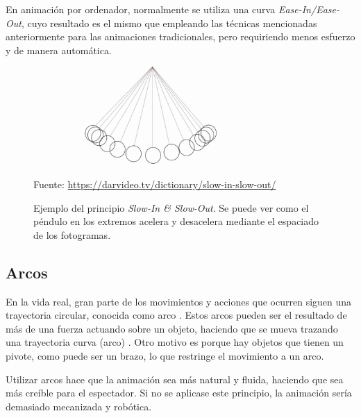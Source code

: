 \documentclass{article}
\begin{document}
\bigskip

En animación por ordenador, normalmente se utiliza una curva \textit{Ease-In/Ease-Out}, cuyo resultado es el mismo que empleando las técnicas mencionadas anteriormente para las animaciones tradicionales, pero requiriendo menos esfuerzo y de manera automática.

\begin{figure}[H]
    \centering
    \includegraphics[width=0.8\textwidth]{imagenes/Slow-In-and-Slow-Out.jpg}
    \caption{Ejemplo del principio \textit{Slow-In \& Slow-Out}. Se puede ver como el péndulo en los extremos acelera y desacelera mediante el espaciado de los fotogramas.}
    \vspace{10pt}
    \footnotesize{Fuente: \url{https://darvideo.tv/dictionary/slow-in-slow-out/}}
\end{figure}

\subsection{Arcos}


En la vida real, gran parte de los movimientos y acciones que ocurren siguen una trayectoria circular, conocida como arco \cite{arcsdsource}. Estos arcos pueden ser el resultado de más de una fuerza actuando sobre un objeto, haciendo que se mueva trazando una trayectoria curva (arco) \cite{arcslinkedin}. Otro motivo es porque hay objetos que tienen un pivote, como puede ser un brazo, lo que restringe el movimiento a un arco.

\bigskip

Utilizar arcos hace que la animación sea más natural y fluida, haciendo que sea más creíble para el espectador. Si no se aplicase este principio, la animación sería demasiado mecanizada y robótica.
\end{document}
